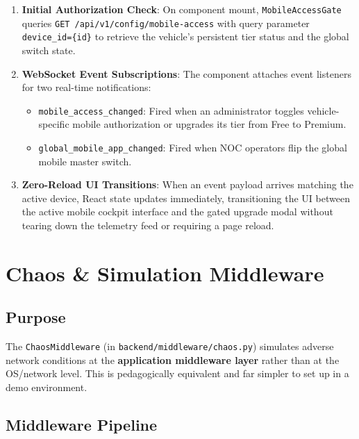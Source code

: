 \documentclass[12pt,a4paper]{report}
\begin{document}
\begin{enumerate}
  \item \textbf{Initial Authorization Check}: On component mount, \texttt{MobileAccessGate} queries \texttt{GET /api/v1/config/mobile-access} with query parameter \texttt{device\_id=\{id\}} to retrieve the vehicle's persistent tier status and the global switch state.
  \item \textbf{WebSocket Event Subscriptions}: The component attaches event listeners for two real-time notifications:
    \begin{itemize}
      \item \texttt{mobile\_access\_changed}: Fired when an administrator toggles vehicle-specific mobile authorization or upgrades its tier from Free to Premium.
      \item \texttt{global\_mobile\_app\_changed}: Fired when NOC operators flip the global mobile master switch.
    \end{itemize}
  \item \textbf{Zero-Reload UI Transitions}: When an event payload arrives matching the active device, React state updates immediately, transitioning the UI between the active mobile cockpit interface and the gated upgrade modal without tearing down the telemetry feed or requiring a page reload.
\end{enumerate}


\chapter{Chaos \& Simulation Middleware}

\section{Purpose}

The \texttt{ChaosMiddleware} (in \texttt{backend/middleware/chaos.py}) simulates adverse network conditions at the \textbf{application middleware layer} rather than at the OS/network level. This is pedagogically equivalent and far simpler to set up in a demo environment.

\section{Middleware Pipeline}
\end{document}
